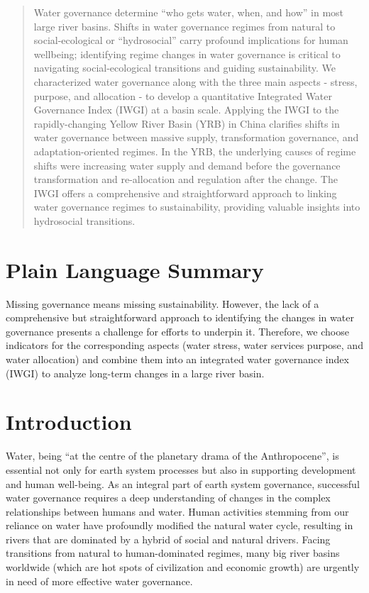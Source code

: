 \documentclass[draft]{../agujournal2019}
\providecommand{\DIFadd}[1]{{\protect\color{blue}\uwave{#1}}} %
\providecommand{\DIFaddbegin}{} %
\providecommand{\DIFaddend}{} %
\providecommand{\DIFdelbegin}{} %
\providecommand{\DIFdelend}{} %
\begin{document}
\begin{abstract}
Water governance determine ``who gets water, when, and how'' in most large river basins.
Shifts in water governance regimes from natural to social-ecological or ``hydrosocial'' carry profound implications for human wellbeing; identifying regime changes in water governance is critical to navigating social-ecological transitions and guiding sustainability.
We characterized water governance along with the three main aspects - stress, purpose, and allocation - to develop a quantitative Integrated Water Governance Index (IWGI) at a basin scale.
Applying the IWGI to the rapidly-changing Yellow River Basin (YRB) in China clarifies shifts in water governance between massive supply, transformation governance, and adaptation-oriented regimes.
In the YRB, the underlying causes of regime shifts were increasing water supply and demand before the governance transformation and re-allocation and regulation after the change.
The IWGI offers a comprehensive and straightforward approach to linking water governance regimes to sustainability, providing valuable insights into hydrosocial transitions.
\end{abstract}

\section*{Plain Language Summary}
Missing governance means missing sustainability. However, the lack of a comprehensive but straightforward approach to identifying the changes in water governance presents a challenge for efforts to underpin it. Therefore, we choose indicators for the corresponding aspects (water stress, water services purpose, and water allocation) and combine them into an integrated water governance index (IWGI) to analyze long-term changes in a large river basin.


\section{Introduction}\label{sec1}
\DIFdelbegin %
\DIFdelend \DIFaddbegin

\DIFaddend Water, being ``at the centre of the planetary drama of the Anthropocene'', is essential not only for earth system processes but also in supporting development and human well-being\DIFaddbegin \DIFadd{~}\DIFaddend \cite{gleeson2020a,gleeson2020b}.
As an integral part of earth system governance, successful water governance requires a deep understanding of changes in the complex relationships between humans and water\DIFaddbegin \DIFadd{~}\DIFaddend \cite{ahlstrom2021,biermann2012,steffen2020}.
Human activities stemming from our reliance on water have profoundly modified the natural water cycle, resulting in rivers that are dominated by a hybrid of social and natural drivers\DIFaddbegin \DIFadd{~}\DIFaddend \cite{sivapalan2012,qin2014,abbott2019}.
Facing transitions from natural to human-dominated regimes, many big river basins worldwide (which are hot spots of civilization and economic growth) are urgently in need of more effective water governance\DIFaddbegin \DIFadd{~}\DIFaddend \cite{best2019,dibaldassarre2019}.
\end{document}

